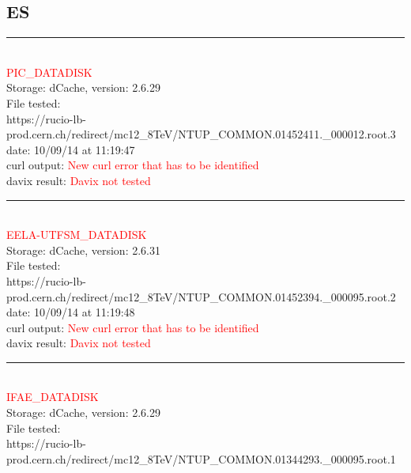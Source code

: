 \subsection{ES}

\rule{\textwidth}{1pt}\\

\textcolor{red}{\normalsize{PIC\_DATADISK}}\\

Storage: dCache, version: 2.6.29\\

File tested:\\
\footnotesize{https://rucio-lb-prod.cern.ch/redirect/mc12\_8TeV/NTUP\_COMMON.01452411.\_000012.root.3}\\

date: 10/09/14 at 11:19:47\\

curl output:  \textcolor{red}{New curl error that has to be identified}\\

davix result:  \textcolor{red}{Davix not tested}\\

\rule{\textwidth}{1pt}\\

\textcolor{red}{\normalsize{EELA-UTFSM\_DATADISK}}\\

Storage: dCache, version: 2.6.31\\

File tested:\\
\footnotesize{https://rucio-lb-prod.cern.ch/redirect/mc12\_8TeV/NTUP\_COMMON.01452394.\_000095.root.2}\\

date: 10/09/14 at 11:19:48\\

curl output:  \textcolor{red}{New curl error that has to be identified}\\

davix result:  \textcolor{red}{Davix not tested}\\

\rule{\textwidth}{1pt}\\

\textcolor{red}{\normalsize{IFAE\_DATADISK}}\\

Storage: dCache, version: 2.6.29\\

File tested:\\
\footnotesize{https://rucio-lb-prod.cern.ch/redirect/mc12\_8TeV/NTUP\_COMMON.01344293.\_000095.root.1}\\

